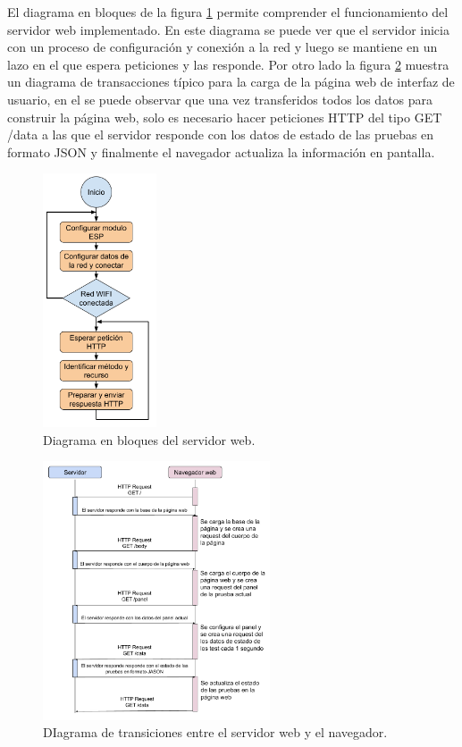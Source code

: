 El diagrama en bloques de la figura \ref{fig:BloquesServidor} permite comprender el funcionamiento del servidor web implementado. En este diagrama se puede ver que el servidor inicia con un proceso de configuración y conexión a la red y luego se mantiene en un lazo en el que espera peticiones y las responde.
Por otro lado la figura \ref{fig:TransaccionesHTTP} muestra un diagrama de transacciones típico para la carga de la página web de interfaz de usuario, en el se puede observar que una vez transferidos todos los datos para construir la página web, solo es necesario hacer peticiones HTTP del tipo GET /data a las que el servidor responde con los datos de estado de las pruebas en formato JSON y finalmente el navegador actualiza la información en pantalla.

\begin{figure}[H]
	\centering
	\includegraphics[width=0.3\textwidth]{./Figures/BloquesServidor.pdf}
	\caption{Diagrama en bloques del servidor web.}
	\label{fig:BloquesServidor}
\end{figure}

\begin{figure}[H]
	\centering
	\includegraphics[width=0.6\textwidth]{./Figures/TransaccionesHTTP.pdf}
	\caption{DIagrama de transiciones entre el servidor web y el navegador.}
	\label{fig:TransaccionesHTTP}
\end{figure}

